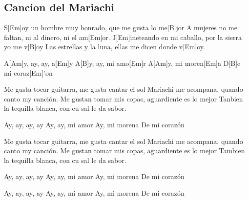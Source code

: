 \subsection*{Cancion del Mariachi   }
\begin{guitar}
S[Em]oy un hombre muy honrado, que me gusta lo me[B]jor
A mujeres no me faltan, ni al dinero, ni el am[Em]or.
J[Em]ineteando en mi caballo, por la sierra yo me v[B]oy
Las estrellas y la luna, ellas me dicen donde v[Em]oy.



A[Am]y, ay, ay, a[Em]y
A[B]y, ay, mi amo[Em]r
A[Am]y, mi moren[Em]a
D[B]e mi coraz[Em]'on



Me gusta tocar guitarra, me gusta cantar el sol
Mariachi me acompana, quando canto my canci\'{o}n.
Me gustan tomar mis copas, aguardiente es lo mejor
Tanbien la tequilla blanca, con cu sal le da sabor.



Ay, ay, ay, ay
Ay, ay, mi amor
Ay, mi morena
De mi coraz\'{o}n



Me gusta tocar guitarra, me gusta cantar el sol
Mariachi me acompana, quando canto my canci\'{o}n.
Me gustan tomar mis copas, aguardiente es lo mejor
Tambien la tequilla blanca, con cu sal le da sabor.



Ay, ay, ay, ay
Ay, ay, mi amor
Ay, mi morena
De mi coraz\'{o}n



Ay, ay, ay, ay
Ay, ay, mi amor
Ay, mi morena
De mi coraz\'{o}n
\end{guitar}

